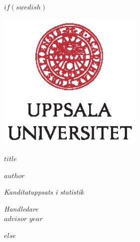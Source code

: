 \documentclass[a4paper,11pt]{article}
\renewcommand{\baselinestretch}{1.5}
\begin{document}
$if(swedish)$
\thispagestyle{empty}
\begin{center}
\includegraphics[width=7cm]{UU_logo_CMYK.eps}
\end{center}
\vspace{1.5cm}
\begin{center}
\begin{Large}
{\bf $title$}
\end{Large}
\end{center}
\vskip1.5cm
\renewcommand{\baselinestretch}{1}
\begin{center}
{\large $author$}
\vskip2.5cm
\begin{center}
\begin{large}
{\it Kanditatuppsats i statistik}\\
\end{large}
\end{center}
\vskip2cm
{\large\it Handledare}\\
{\large $advisor$}
\vskip2cm
{\large $year$}
\end{center}\vfill
$else$
\end{document}
